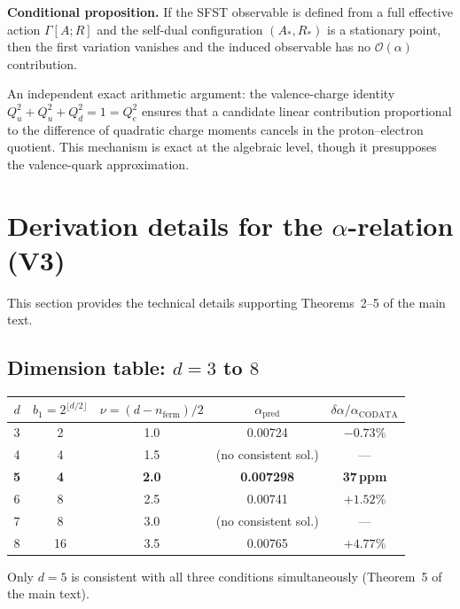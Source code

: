 \documentclass[11pt,a4paper]{article}
\begin{document}
\textbf{Conditional proposition.}  If the SFST observable is defined from a full
effective action $\Gamma[A;R]$ and the self-dual configuration $(A_*,R_*)$ is a
stationary point, then the first variation vanishes and the induced observable has
no $\mathcal{O}(\alpha)$ contribution.

An independent exact arithmetic argument: the valence-charge identity
$Q_u^2+Q_u^2+Q_d^2=1=Q_e^2$ ensures that a candidate linear contribution
proportional to the difference of quadratic charge moments cancels in the
proton--electron quotient.  This mechanism is exact at the algebraic level,
though it presupposes the valence-quark approximation.

\section{Derivation details for the $\alpha$-relation (V3)}
\label{sec:V3details}

This section provides the technical details supporting Theorems~2--5 of the
main text.

\subsection{Dimension table: $d=3$ to $8$}

\begin{center}
\renewcommand{\arraystretch}{1.15}
\begin{tabular}{ccccc}
\toprule
$d$ & $b_1=2^{\lfloor d/2\rfloor}$ & $\nu=(d-n_{\mathrm{ferm}})/2$
    & $\alpha_{\mathrm{pred}}$ & $\delta\alpha/\alpha_{\mathrm{CODATA}}$\\
\midrule
3 & 2 & 1.0 & 0.00724 & $-0.73\%$\\
4 & 4 & 1.5 & (no consistent sol.) & ---\\
\textbf{5} & \textbf{4} & \textbf{2.0} & \textbf{0.007298} & \textbf{37\,ppm}\\
6 & 8 & 2.5 & 0.00741 & $+1.52\%$\\
7 & 8 & 3.0 & (no consistent sol.) & ---\\
8 & 16 & 3.5 & 0.00765 & $+4.77\%$\\
\bottomrule
\end{tabular}
\end{center}

Only $d=5$ is consistent with all three conditions simultaneously
(Theorem~5 of the main text).
\end{document}
